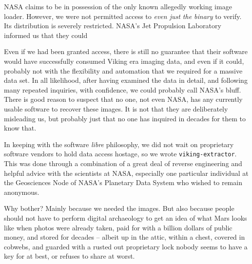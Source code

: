NASA claims to be in possession of the only known allegedly working image loader. However, we were not permitted access to {\it even just the binary} to verify. Its distribution is severely restricted. NASA's Jet Propulsion Laboratory informed us that they could 

Even if we had been granted access, there is still no guarantee that their software would have successfully consumed Viking era imaging data, and even if it could, probably not with the flexibility and automation that we required for a massive data set. In all likelihood, after having examined the data in detail, and following many repeated inquiries, with confidence, we could probably call NASA's bluff. There is good reason to suspect that no one, not even NASA, has any currently usable software to recover these images. It is not that they are deliberately misleading us, but probably just that no one has inquired in decades for them to know that.


In keeping with the software {\it libre} philosophy, we did not wait on proprietary software vendors to hold data access hostage, so we wrote {\tt viking-extractor}. This was done through a combination of a great deal of reverse engineering and helpful advice with the scientists at NASA, especially one particular individual at the Geosciences Node of NASA's Planetary Data System who wished to remain anonymous.

Why bother? Mainly because we needed the images. But also because people should not have to perform digital archaeology to get an idea of what Mars looks like when photos were already taken, paid for with a billion dollars of public money, and stored for decades -- albeit up in the attic, within a chest, covered in cobwebs, and guarded with a rusted out proprietary lock nobody seems to have a key for at best, or refuses to share at worst.

    {}


